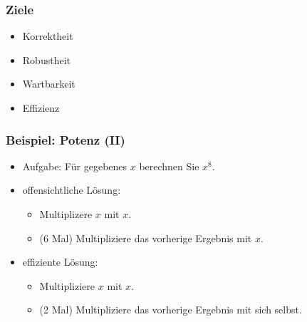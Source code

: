     \begin{frame}
        \frametitle{Ziele}
        \begin{itemize}
            \item Korrektheit %
            \pause
            \item Robustheit  %
            \pause
            \item Wartbarkeit %
            \pause
            \item Effizienz   %
        \end{itemize}
    \end{frame}

    \begin{frame}
        \frametitle{Beispiel: Potenz (II)}
        \begin{itemize}
            \item Aufgabe: Für gegebenes $x$ berechnen Sie $x^8$.
            \pause
            \item offensichtliche Lösung: 
            \begin{itemize}
                \item Multiplizere $x$ mit $x$.
                \item (6 Mal) Multipliziere das vorherige Ergebnis mit $x$.
            \end{itemize}
            \pause\pause
            \item effiziente Lösung: 
            \begin{itemize}
                \item Multipliziere $x$ mit $x$.
                \item (2 Mal) Multipliziere das vorherige Ergebnis mit sich selbst.
            \end{itemize}
        \end{itemize}
    \end{frame}

